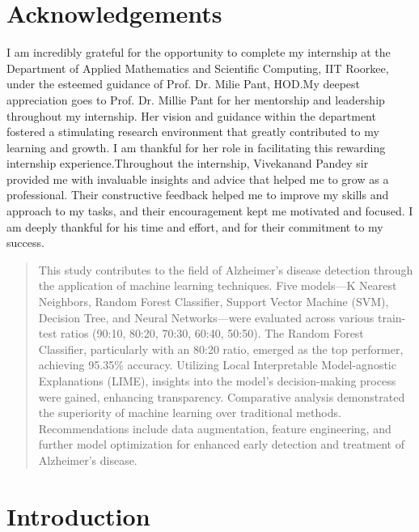 \documentclass[a4paper,12pt]{report}
\begin{document}
\chapter*{Acknowledgements}
\thispagestyle{empty}

I am incredibly grateful for the opportunity to complete my internship at the Department of Applied Mathematics and Scientific Computing, IIT Roorkee, under the esteemed guidance of Prof. Dr. Milie Pant, HOD.\newline My deepest appreciation goes to Prof. Dr. Millie Pant for her mentorship and leadership throughout my internship.  Her vision and guidance within the department fostered a stimulating research environment that greatly contributed to my learning and growth. I am  thankful for her role in facilitating this rewarding internship experience.\newline Throughout the internship, Vivekanand Pandey sir provided me with invaluable insights and advice that helped me to grow as a professional. Their constructive feedback helped me to improve my skills and approach to my tasks, and their encouragement kept me motivated and focused. I am deeply thankful for his time and effort, and for their commitment to my success.

\clearpage


\begin{abstract}
This study contributes to the field of Alzheimer’s disease detection through the application of machine learning techniques. Five models—K Nearest Neighbors, Random Forest Classifier, Support Vector Machine (SVM), Decision Tree, and Neural Networks—were evaluated across various train-test ratios (90:10, 80:20, 70:30, 60:40, 50:50). The Random Forest Classifier, particularly with an 80:20 ratio, emerged as the top performer, achieving 95.35\% accuracy. Utilizing Local Interpretable Model-agnostic Explanations (LIME), insights into the model's decision-making process were gained, enhancing transparency. Comparative analysis demonstrated the superiority of machine learning over traditional methods. Recommendations include data augmentation, feature engineering, and further model optimization for enhanced early detection and treatment of Alzheimer’s disease.
\end{abstract}

\tableofcontents
\newpage

\chapter{Introduction}
\end{document}
